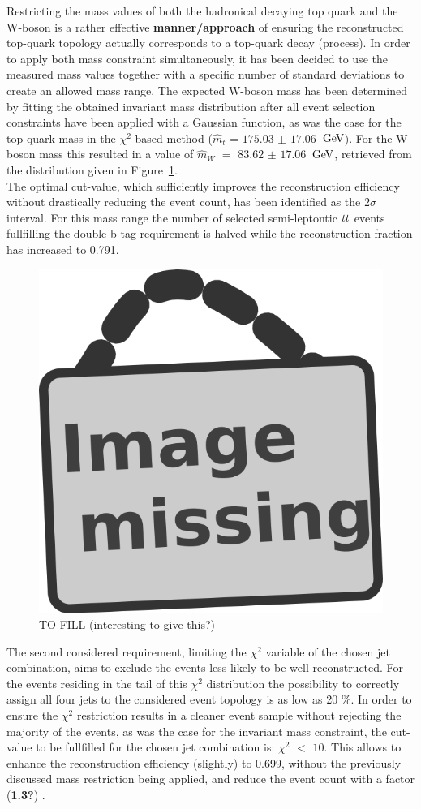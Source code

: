 Restricting the mass values of both the hadronical decaying top quark and the W-boson is a rather effective \textbf{manner/approach} of ensuring the reconstructed top-quark topology actually corresponds to a top-quark decay (process).
In order to apply both mass constraint simultaneously, it has been decided to use the measured mass values together with a specific number of standard deviations to create an allowed mass range.
The expected W-boson mass has been determined by fitting the obtained invariant mass distribution after all event selection constraints have been applied with a Gaussian function, as was the case for the top-quark mass in the $\chi^{2}$-based method ($\hat{m}_{t}$ = $175.03$ $\pm$ $17.06$ $\, \mathrm{GeV}$). For the W-boson mass this resulted in a value of $\hat{m}_{W}$ $=$ $83.62$ $\pm$ $17.06$ $\, \mathrm{GeV}$, retrieved from the distribution given in Figure~\ref{fig::InvWMass}.
\\
The optimal cut-value, which sufficiently improves the reconstruction efficiency without drastically reducing the event count, has been identified as the $2\sigma$ interval. For this mass range the number of selected semi-leptontic $t\bar{t}$ events fullfilling the double b-tag requirement is halved while the reconstruction fraction has increased to 0.791.
\begin{figure}[h!t]
 \centering
 \includegraphics[width = 0.4 \textwidth]{image.png}  %
 \caption{TO FILL (interesting to give this?)} \label{fig::InvWMass}
\end{figure}

The second considered requirement, limiting the $\chi^{2}$ variable of the chosen jet combination, aims to exclude the events less likely to be well reconstructed.
For the events residing in the tail of this $\chi^{2}$ distribution the possibility to correctly assign all four jets to the considered event topology is as low as 20 $\%$.
In order to ensure the $\chi^{2}$ restriction results in a cleaner event sample without rejecting the majority of the events, as was the case for the invariant mass constraint, the cut-value to be fullfilled for the chosen jet combination is: $\chi^{2}$ $<$ $10$.
This allows to enhance the reconstruction efficiency (slightly) to 0.699, without the previously discussed mass restriction being applied, and reduce the event count with a factor (\textbf{1.3?}) .
\\

